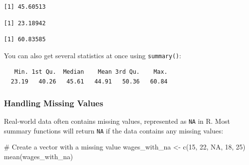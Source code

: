 \documentclass[
  letterpaper,
  DIV=11,
  numbers=noendperiod]{scrreprt}
\newenvironment{Shaded}{\begin{snugshade}}{\end{snugshade}}
\newcommand{\CommentTok}[1]{\textcolor[rgb]{0.37,0.37,0.37}{#1}}
\newcommand{\ConstantTok}[1]{\textcolor[rgb]{0.56,0.35,0.01}{#1}}
\newcommand{\DecValTok}[1]{\textcolor[rgb]{0.68,0.00,0.00}{#1}}
\newcommand{\FunctionTok}[1]{\textcolor[rgb]{0.28,0.35,0.67}{#1}}
\newcommand{\NormalTok}[1]{\textcolor[rgb]{0.00,0.23,0.31}{#1}}
\newcommand{\OtherTok}[1]{\textcolor[rgb]{0.00,0.23,0.31}{#1}}
\newcommand{\SpecialCharTok}[1]{\textcolor[rgb]{0.37,0.37,0.37}{#1}}
\begin{document}
\begin{verbatim}
[1] 45.60513
\end{verbatim}

\begin{Shaded}
\end{Shaded}

\begin{verbatim}
[1] 23.18942
\end{verbatim}

\begin{Shaded}
\end{Shaded}

\begin{verbatim}
[1] 60.83585
\end{verbatim}

You can also get several statistics at once using \texttt{summary()}:

\begin{Shaded}
\end{Shaded}

\begin{verbatim}
   Min. 1st Qu.  Median    Mean 3rd Qu.    Max. 
  23.19   40.26   45.61   44.91   50.36   60.84 
\end{verbatim}

\subsubsection{Handling Missing Values}\label{handling-missing-values}

Real-world data often contains missing values, represented as
\texttt{NA} in R. Most summary functions will return \texttt{NA} if the
data contains any missing values:

\begin{Shaded}
\begin{Highlighting}[]
\CommentTok{\# Create a vector with a missing value}
\NormalTok{wages\_with\_na }\OtherTok{\textless{}{-}} \FunctionTok{c}\NormalTok{(}\DecValTok{15}\NormalTok{, }\DecValTok{22}\NormalTok{, }\ConstantTok{NA}\NormalTok{, }\DecValTok{18}\NormalTok{, }\DecValTok{25}\NormalTok{)}
\FunctionTok{mean}\NormalTok{(wages\_with\_na)}
\end{Highlighting}
\end{Shaded}
\end{document}
